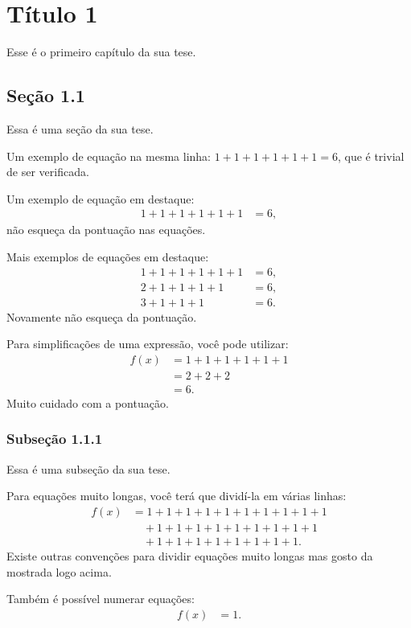 \chapter{T\'itulo 1}
Esse \'e o primeiro cap\'itulo da sua tese.

\section{Se\c c\~ao 1.1}
Essa é uma seção da sua tese.

Um exemplo de equação na mesma linha: 
$ 1 + 1 + 1 + 1 + 1 + 1 = 6$, 
que é trivial de ser verificada.

Um exemplo de equação em destaque:
\begin{align*}
1 + 1 + 1 + 1 + 1 + 1 &= 6,
\end{align*}
não esqueça da pontuação nas equações.

Mais exemplos de equações em destaque:
\begin{align*}
1 + 1 + 1 + 1 + 1 + 1 &= 6, \\
2 + 1 + 1 + 1 + 1 &= 6, \\
3 + 1 + 1 + 1 &= 6.
\end{align*}
Novamente não esqueça da pontuação.

Para simplificações de uma expressão, você pode utilizar:
\begin{align*}
    f(x) &= 1 + 1 + 1 + 1 + 1 + 1 \\
    &= 2 + 2 + 2 \\
    &= 6.
\end{align*}
Muito cuidado com a pontuação.

\subsection{Subse\c c\~ao 1.1.1}
Essa é uma subseção da sua tese.

Para equações muito longas, você terá que dividí-la em várias linhas:
\begin{align*}
    f(x) &= 1 + 1 + 1 + 1 + 1 + 1 + 1 + 1 + 1 + 1 \\
    &\quad {}+ 1 + 1 + 1 + 1 + 1 + 1 + 1 + 1 + 1 \\
    &\quad {}+ 1 + 1 + 1 + 1 + 1 + 1 + 1 + 1.
\end{align*}
Existe outras convenções para dividir equações muito longas mas gosto da
mostrada logo acima.

Também é possível numerar equações:
\begin{align}
    f(x) &= 1.
    \label{eq:exem_unidade}
\end{align}

